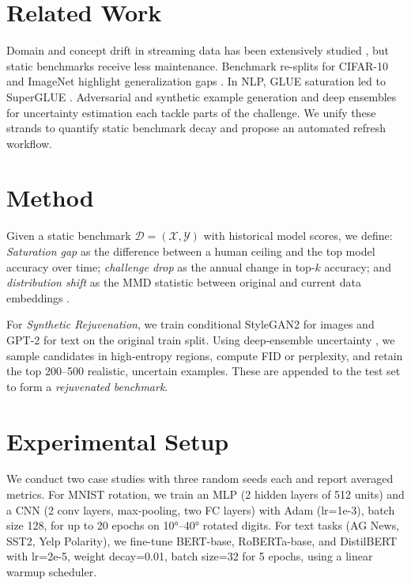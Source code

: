 \documentclass{article} %
\begin{document}
\section{Related Work}
Domain and concept drift in streaming data has been extensively studied \citep{gupta2024twinadaptcl}, but static benchmarks receive less maintenance. Benchmark re-splits for CIFAR-10 and ImageNet highlight generalization gaps \citep{recht2019doic}. In NLP, GLUE \citep{wang2018glueam} saturation led to SuperGLUE \citep{wang2019superglueas}. Adversarial and synthetic example generation \citep{goodfellow2014explainingah, heusel2017ganstb} and deep ensembles for uncertainty estimation \citep{lakshminarayanan2016simpleas} each tackle parts of the challenge. We unify these strands to quantify static benchmark decay and propose an automated refresh workflow.

\section{Method}
Given a static benchmark $\mathcal{D}=(\mathcal{X},\mathcal{Y})$ with historical model scores, we define:
\emph{Saturation gap} as the difference between a human ceiling and the top model accuracy over time; \emph{challenge drop} as the annual change in top-$k$ accuracy; and \emph{distribution shift} as the MMD statistic between original and current data embeddings \citep{gretton2012akt}.

For \emph{Synthetic Rejuvenation}, we train conditional StyleGAN2 \citep{karras2019analyzingai} for images and GPT-2 \citep{radford2019languagema} for text on the original train split. Using deep‐ensemble uncertainty \citep{lakshminarayanan2016simpleas}, we sample candidates in high‐entropy regions, compute FID \citep{heusel2017ganstb} or perplexity, and retain the top 200–500 realistic, uncertain examples. These are appended to the test set to form a \emph{rejuvenated benchmark}.

\section{Experimental Setup}
We conduct two case studies with three random seeds each and report averaged metrics. For MNIST rotation, we train an MLP (2 hidden layers of 512 units) and a CNN (2 conv layers, max‐pooling, two FC layers) with Adam (lr=1e-3), batch size 128, for up to 20 epochs on 10°–40° rotated digits. For text tasks (AG News, SST2, Yelp Polarity), we fine-tune BERT-base, RoBERTa-base, and DistilBERT with lr=2e-5, weight decay=0.01, batch size=32 for 5 epochs, using a linear warmup scheduler.
\end{document}
